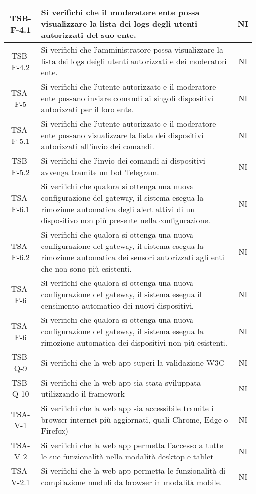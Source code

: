 \begin{center}
\begin{longtable}{|c|p{10cm}|c|}
			 \hline
			 TSB-F-4.1 & Si verifichi che il moderatore ente possa visualizzare la lista dei logs degli utenti autorizzati del suo ente. & NI \\
			 \hline
			 TSB-F-4.2 & Si verifichi che l'amministratore possa visualizzare la lista dei logs deigli utenti autorizzati e dei moderatori ente. & NI \\
			 \hline
			 TSA-F-5 & Si verifichi che l'utente autorizzato e il moderatore ente possano inviare comandi ai singoli dispositivi autorizzati per il loro ente. & NI \\
			 \hline
			 TSA-F-5.1 & Si verifichi che l'utente autorizzato e il moderatore ente possano visualizzare la lista dei dispositivi autorizzati all'invio dei comandi. & NI \\
			 \hline
			 TSB-F-5.2 & Si verifichi che l'invio dei comandi ai dispositivi avvenga tramite un bot Telegram. & NI \\
			 \hline
			 TSA-F-6.1 & Si verifichi che qualora si ottenga una nuova configurazione del gateway, il sistema esegua la rimozione automatica degli alert attivi di un dispositivo non più presente nella configurazione. & NI \\
			 \hline
			 TSA-F-6.2 & Si verifichi che qualora si ottenga una nuova configurazione del gateway, il sistema esegua la rimozione automatica dei sensori autorizzati agli enti che non sono più esistenti. & NI \\
			 \hline
			 TSA-F-6 & Si verifichi che qualora si ottenga una nuova configurazione del gateway, il sistema esegua il censimento automatico dei nuovi dispositivi. & NI \\
			 \hline
			 TSA-F-6 & Si verifichi che qualora si ottenga una nuova configurazione del gateway, il sistema esegua la rimozione automatica dei dispositivi non più esistenti. & NI \\
			 \hline
			 TSB-Q-9 & Si verifichi che la web app superi la validazione W3C & NI \\
			 \hline
			 TSB-Q-10 & Si verifichi che la web app sia stata sviluppata utilizzando il framework \glock{Bootstrap} & NI \\
			 \hline
			 TSA-V-1 & Si verifichi che la web app sia accessibile tramite i browser internet più aggiornati, quali Chrome, Edge o Firefox) & NI \\
			 \hline
			 TSA-V-2 & Si verifichi che la web app permetta l'accesso a tutte le sue funzionalità nella modalità desktop e tablet. & NI \\ 
			 \hline
			 TSA-V-2.1 & Si verifichi che la web app permetta le funzionalità di compilazione moduli da browser in modalità mobile. & NI \\

\end{longtable}
\end{center}

